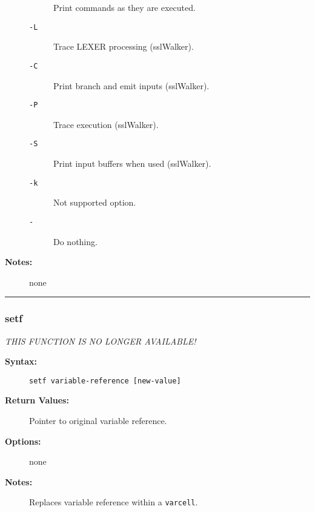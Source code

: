 \begin{description}
\begin{description}
Print commands as they are executed.

\item[{\tt -L}] \mbox{}

Trace LEXER processing (sslWalker).

\item[{\tt -C}] \mbox{}

Print branch and emit inputs (sslWalker).

\item[{\tt -P}] \mbox{}

Trace execution (sslWalker).

\item[{\tt -S}] \mbox{}

Print input buffers when used (sslWalker). 

\item[{\tt -k}] \mbox{}

Not supported option.

\item[{\tt -}] \mbox{}

Do nothing.

\end{description}


\item[{\bf Notes:}] \mbox{}

none  

\end{description}


\hrule
\subsubsection{setf}

{\em THIS FUNCTION IS NO LONGER AVAILABLE! }

\begin{description}
\item[{\bf Syntax:}] \mbox{}

{\tt setf variable-reference [new-value]}

\item[{\bf Return Values:}] \mbox{}

Pointer to original variable reference.

\item[{\bf Options:}] \mbox{}

none  

\item[{\bf Notes:}] \mbox{}

Replaces variable reference within a {\tt varcell}.

\end{description}


